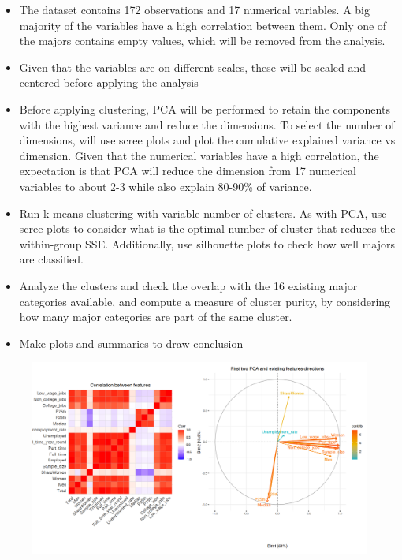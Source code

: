 \documentclass[11pt,a4paper]{article}
\begin{document}
\begin{itemize}
    \item The dataset contains 172 observations and 17 numerical variables. A big majority of the variables have a high correlation between them. Only one of the majors contains empty values, which will be removed from the analysis.
    \item Given that the variables are on different scales, these will be scaled and centered before applying the analysis
    \item Before applying clustering, PCA will be performed to retain the components with the highest variance and reduce the dimensions. To select the number of dimensions, will use scree plots and plot the cumulative explained variance vs dimension. Given that the numerical variables have a high correlation, the expectation is that PCA will reduce the dimension from 17 numerical variables to about 2-3 while also explain 80-90\% of variance.
    \item Run k-means clustering with variable number of clusters. As with PCA, use scree plots to consider what is the optimal number of cluster that reduces the within-group SSE. Additionally, use silhouette plots to check how well majors are classified.
    \item Analyze the clusters and check the overlap with the 16 existing major categories available, and compute a measure of cluster purity, by considering how many major categories are part of the same cluster.
    \item Make plots and summaries to draw conclusion 
\end{itemize}

\begin{figure} [H]
    \begin{center}
        \includegraphics[scale=1, width=18cm]{plots.png}
        \label{fig:sampledvsdata}
    \end{center}
\end{figure}
\end{document}
